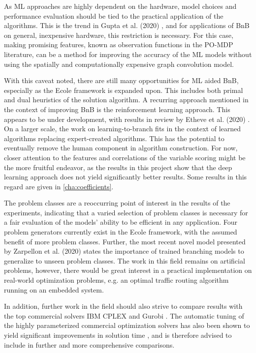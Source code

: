 As \gls{ML} approaches are highly dependent on the hardware, model choices and performance evaluation should be tied to the practical application of the algorithms. This is the trend in Gupta et al. (2020) \cite{gupta2020hybrid}, and for applications of \gls{BnB} on general, inexpensive hardware, this restriction is necessary. For this case, making promising features, known as observation functions in the \gls{PO-MDP} literature, can be a method for improving the accuracy of the \gls{ML} models without using the spatially and computationally expensive graph convolution model. 

With this caveat noted, there are still many opportunities for \gls{ML} aided \gls{BnB}, especially as the \gls{Ecole} framework is expanded upon. This includes both primal and dual heuristics of the solution algorithm.
A recurring approach mentioned in the context of improving \gls{BnB} is the reinforcement learning approach. This appears to be under development, with results in review by Etheve et al. (2020) \cite{etheve2020reinforcement}. On a larger scale, the work on learning-to-branch fits in the context of learned algorithms replacing expert-created algorithms. This has the potential to eventually remove the human component in algorithm construction. For now, closer attention to the features and correlations of the variable scoring might be the more fruitful endeavor, as the results in this project show that the deep learning approach does not yield significantly better results. Some results in this regard are given in \cref{cha:coefficients}. 

The problem classes are a reoccurring point of interest in the results of the experiments, indicating that a varied selection of problem classes is necessary for a fair evaluation of the models' ability to be efficient in any application. Four problem generators currently exist in the \gls{Ecole} framework, with the assumed benefit of more problem classes. Further, the most recent novel model presented by Zarpellon et al. (2020) \cite{zarpellon2020parameterizing} states the importance of trained branching models to generalize to unseen problem classes.
The work in this field remains on artificial problems, however, there would be great interest in a practical implementation on real-world optimization problems, e.g. an optimal traffic routing algorithm running on an embedded system. 

In addition, further work in the field should also strive to compare results with the top commercial solvers IBM CPLEX and Gurobi \cite{anand2017comparative}. The automatic tuning of the highly parameterized commercial optimization solvers has also been shown to yield significant improvements in solution time \cite{hutter2010automated}, and is therefore advised to include in further and more comprehensive comparisons.   





